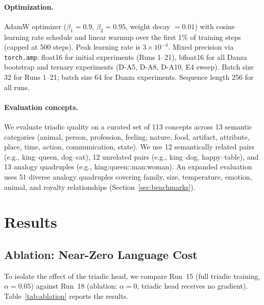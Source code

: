 \documentclass[11pt,a4paper]{article}
\begin{document}
\paragraph{Optimization.} AdamW optimizer ($\beta_1 = 0.9$, $\beta_2 = 0.95$, weight decay $= 0.01$) with cosine learning rate schedule and linear warmup over the first 1\% of training steps (capped at 500 steps). Peak learning rate is $3 \times 10^{-4}$. Mixed precision via \texttt{torch.amp}: float16 for initial experiments (Runs 1--21), bfloat16 for all Danza bootstrap and ternary experiments (D-A5, D-A8, D-A10, E4 sweep). Batch size 32 for Runs 1--21; batch size 64 for Danza experiments. Sequence length 256 for all runs.

\paragraph{Evaluation concepts.} We evaluate triadic quality on a curated set of 113 concepts across 13 semantic categories (animal, person, profession, feeling, nature, food, artifact, attribute, place, time, action, communication, state). We use 12 semantically related pairs (e.g., king--queen, dog--cat), 12 unrelated pairs (e.g., king--dog, happy--table), and 13 analogy quadruples (e.g., king:queen::man:woman). An expanded evaluation uses 51 diverse analogy quadruples covering family, size, temperature, emotion, animal, and royalty relationships (Section~\ref{sec:benchmarks}).


\section{Results}
\label{sec:results}

\subsection{Ablation: Near-Zero Language Cost}
\label{sec:ablation}

To isolate the effect of the triadic head, we compare Run~15 (full triadic training, $\alpha = 0.05$) against Run~18 (ablation: $\alpha = 0$, triadic head receives no gradient). Table~\ref{tab:ablation} reports the results.
\end{document}
